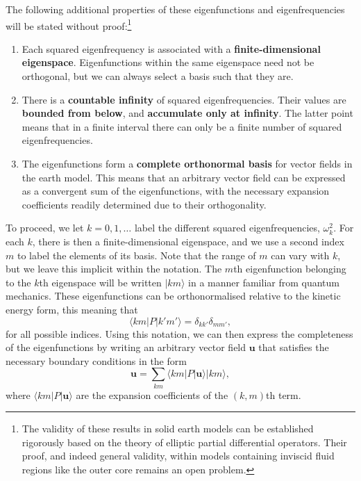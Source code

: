 The following additional properties of these eigenfunctions and eigenfrequencies will be stated without proof:\footnote{The validity 
of these results in solid earth models can be established rigorously based on the theory of elliptic partial differential operators. 
Their proof, and indeed general validity, within models containing inviscid fluid regions like the outer core remains an open problem.}
\begin{enumerate}
    \item Each squared eigenfrequency is associated with a \textbf{finite-dimensional eigenspace}. Eigenfunctions within the same 
    eigenspace need not be orthogonal, but we can always select a basis such that they are.

    \item There is a \textbf{countable infinity} of squared eigenfrequencies. Their values are \textbf{bounded from below}, and
     \textbf{accumulate only at infinity}. The latter point means that in a finite interval there can only be a finite number
      of squared eigenfrequencies.

    \item The eigenfunctions form a \textbf{complete orthonormal basis} for vector fields in the earth model. This means that an arbitrary vector 
    field can be expressed as a convergent sum of the eigenfunctions, with the necessary expansion coefficients readily determined due to 
    their orthogonality.
\end{enumerate}


To proceed, we let $k=0,1,\dots$ label the different squared eigenfrequencies, $\omega_{k}^{2}$. For each $k$, there is then a 
finite-dimensional eigenspace, and we use a second index $m$ to label the elements of its basis. Note that the range of $m$ can 
vary with $k$, but we leave this implicit within the notation. The $m$th eigenfunction belonging to the $k$th eigenspace will be 
written $|km\rangle$ in a manner familiar from quantum mechanics. These eigenfunctions can be orthonormalised relative to the kinetic 
energy form, this meaning that
\begin{equation}
\langle km|P|k'm'\rangle=\delta_{kk'}\delta_{mm'},
\label{eq:25}
\end{equation}
for all possible indices. Using this notation, we can then express the completeness of the eigenfunctions by writing 
an arbitrary vector field $\mathbf{u}$ that satisfies the necessary boundary conditions in the form
\begin{equation}
\mathbf{u}=\sum_{km}\langle km|P|\mathbf{u}\rangle|km\rangle,
\label{eq:26}
\end{equation}
where $\langle km|P|\mathbf{u}\rangle$ are the expansion coefficients of the $(k,m)$th term.

